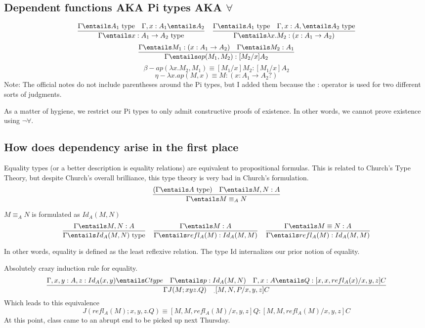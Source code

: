 \documentclass[11pt]{article}
\begin{document}
\subsection*{Dependent functions AKA Pi types AKA $\forall$}
$$\frac{\Gamma \entails A_1 \text{ type} \quad \Gamma, x : A_1 \entails A_2}{\Gamma \entails x : A_1 \rightarrow A_2 \text{ type}} \quad \frac{\Gamma \entails A_1 \text{ type} \quad \Gamma, x : A, \entails A_2 \text{ type}}{\Gamma \entails \lambda x . M_2 : (x : A_1 \rightarrow A_2)}$$
$$\frac{\Gamma \entails M_1 : (x : A_1 \rightarrow A_2) \quad \Gamma \entails M_2 : A_1}{\Gamma \entails ap(M_1, M_2) : [M_2 / x] A_2}$$
$$\beta - ap(\lambda x . M_2 , M_1) \equiv [M_1 / x] M_2 : [M_1 / x] A_2$$
$$\eta - \lambda x . ap (M, x) \equiv M : (x : A_1 \rightarrow A_2?)$$
Note: The official notes do not include parentheses around the Pi types, but I added them because the : operator is used for two different sorts of judgments.

As a matter of hygiene, we restrict our Pi types to only admit constructive proofs of existence. In other words, we cannot prove existence using $\neg \forall$.

\subsection*{How does dependency arise in the first place}
Equality types (or a better description is equality relations) are equivalent to propositional formulas. This is related to Church's Type Theory, but despite Church's overall brilliance, this type theory is very bad in Church's formulation. 
$$\frac{(\Gamma \entails A \text{ type})  \quad \Gamma \entails M, N : A}{\Gamma \entails M \equiv _A N}$$

$M \equiv _A N$ is formulated as $Id_A(M, N)$
$$\frac{\Gamma \entails M, N : A}{\Gamma \entails Id_A (M, N) \text{ type}} \quad \frac{\Gamma \entails M : A}{\Gamma \entails refl_A (M) : Id_A(M, M)} \quad \frac{\Gamma \entails M \equiv N : A}{\Gamma \entails refl_A(M) : Id_A(M, M)}$$
 
In other words, equality is defined as the least reflexive relation. The type Id internalizes our prior notion of equality.

Absolutely crazy induction rule for equality.
$$\frac{\Gamma, x, y : A, z : Id_A (x, y) \entails C type \quad \Gamma \entails p : Id_A(M, N) \quad \Gamma, x : A \entails Q : [x, x, refl_A (x) / x, y, z] C}{\Gamma J(M; xyz.Q) \quad _. [M, N, P / x, y, z] C}$$
Which leads to this equivalence
$$J(refl_A(M); x, y, z.Q) \equiv [M, M, refl_A(M) / x, y, z] Q : [M, M, refl_A(M) / x, y, z] C$$
At this point, class came to an abrupt end to be picked up next Thursday.
\end{document}
